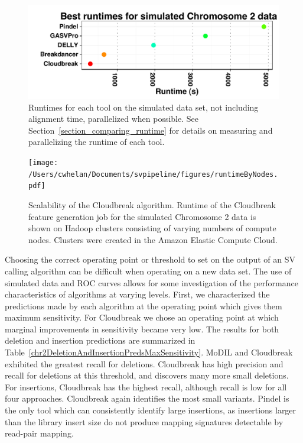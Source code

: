 \begin{figure}
\centering
\includegraphics[width=1\textwidth]{figures/chr2BestRuntimes_horizontal.pdf}
\caption[Runtimes for each tool on the simulated data set]{Runtimes for each tool on the simulated data set, not including alignment time, parallelized when possible. See Section~\ref{section_comparing_runtime} for details on measuring and parallelizing the runtime of each tool.}
\label{chr2BestRuntimes}
\end{figure}

\begin{figure}
\centering
\texttt{[image: /Users/cwhelan/Documents/svpipeline/figures/runtimeByNodes.pdf]}
\caption[Scalability of the Cloudbreak algorithm.]{Scalability of the Cloudbreak algorithm. Runtime of the Cloudbreak feature generation job for the simulated Chromosome 2 data is shown on Hadoop clusters consisting of varying numbers of compute nodes. Clusters were created in the Amazon Elastic Compute Cloud.}
\label{scalability}
\end{figure}

Choosing the correct operating point or threshold to set on the output of an SV calling algorithm can be difficult when operating on a new data set. The use of simulated data and ROC curves allows for some investigation of the performance characteristics of algorithms at varying levels. First, we characterized the predictions made by each algorithm at the operating point which gives them maximum sensitivity. For Cloudbreak we chose an operating point at which marginal improvements in sensitivity became very low. The results for both deletion and insertion predictions are summarized in Table~\ref{chr2DeletionAndInsertionPredsMaxSensitivity}. MoDIL and Cloudbreak exhibited the greatest recall for deletions. Cloudbreak has high precision and recall for deletions at this threshold, and discovers many more small deletions. For insertions, Cloudbreak has the highest recall, although recall is low for all four approaches. Cloudbreak again identifies the most small variants. Pindel is the only tool which can consistently identify large insertions, as insertions larger than the library insert size do not produce mapping signatures detectable by read-pair mapping. 

